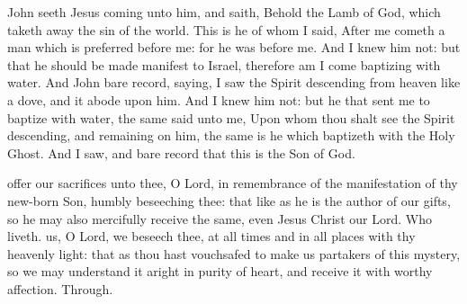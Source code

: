  John seeth Jesus coming unto him, and saith, Behold the Lamb of God, which taketh away the sin of the world. This is he of whom I said, After me cometh a man which is preferred before me: for he was before me. And I knew him not: but that he should be made manifest to Israel, therefore am I come baptizing with water. And John bare record, saying, I saw the Spirit descending from heaven like a dove, and it abode upon him. And I knew him not: but he that sent me to baptize with water, the same said unto me, Upon whom thou shalt see the Spirit descending, and remaining on him, the same is he which baptizeth with the Holy Ghost. And I saw, and bare record that this is the Son of God.

\secret
{} offer our sacrifices unto thee, O Lord, in remembrance of the manifestation of thy new-born Son, humbly beseeching thee: that like as he is the author of our gifts, so he may also mercifully receive the same, even Jesus Christ our Lord. Who liveth.
\postcommunion
{} us, O Lord, we beseech thee, at all times and in all places with thy heavenly light: that as thou hast vouchsafed to make us partakers of this mystery, so we may understand it aright in purity of heart, and receive it with worthy affection. Through.



\clearpage
{}\label{EpiphanyII}
\fancyhead[RE,LO]{}


